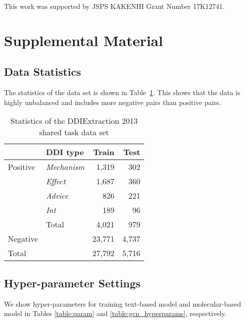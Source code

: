 \documentclass[11pt,a4paper]{article}
\begin{document}
This work was supported by JSPS KAKENHI Grant Number 17K12741.





\clearpage

\appendix
\section{Supplemental Material}
\subsection{Data Statistics}

The statistics of the data set is shown in Table~\ref{table:dataset}. This shows that the data is highly unbalanced and includes more negative pairs than positive pairs. 

\begin{table}[ht]
  \centering
  \begin{tabular}{llrr}\hline
  &DDI type & Train & Test\\\hline
  Positive & \textsl{Mechanism} & 1,319 & 302 \\
  & \textsl{Effect} & 1,687 & 360 \\
  & \textsl{Advice} & 826 & 221 \\
  & \textsl{Int} & 189 & 96 \\
  & Total & 4,021 & 979 \\
  Negative &  & 23,771 & 4,737 \\
  Total &  & 27,792 & 5,716 \\\hline
  \end{tabular}
  \caption{Statistics of the DDIExtraction 2013 shared task data set}
  \label{table:dataset}
\end{table}


\subsection{Hyper-parameter Settings}

We show hyper-parameters for training text-based model and molecular-based model in Tables \ref{table:param} and \ref{table:gcn_hyperparams}, respectively. 
\end{document}

